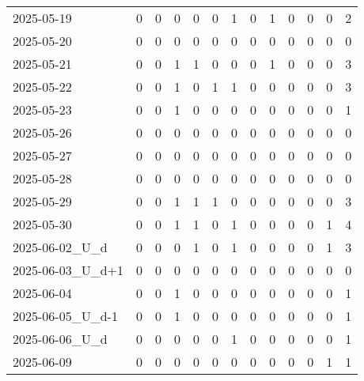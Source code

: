 \documentclass[dvipdfmx,oneside]{article}
\begin{document}
\begin{longtable}{lcccccccccccc}
        2025-05-19 &     0 &     0 &     0 &     0 &     0 &     1 &     0 &     1 &     0 &     0 &     0 &      2 \\
        2025-05-20 &     0 &     0 &     0 &     0 &     0 &     0 &     0 &     0 &     0 &     0 &     0 &      0 \\
        2025-05-21 &     0 &     0 &     1 &     1 &     0 &     0 &     0 &     1 &     0 &     0 &     0 &      3 \\
        2025-05-22 &     0 &     0 &     1 &     0 &     1 &     1 &     0 &     0 &     0 &     0 &     0 &      3 \\
        2025-05-23 &     0 &     0 &     1 &     0 &     0 &     0 &     0 &     0 &     0 &     0 &     0 &      1 \\
        2025-05-26 &     0 &     0 &     0 &     0 &     0 &     0 &     0 &     0 &     0 &     0 &     0 &      0 \\
        2025-05-27 &     0 &     0 &     0 &     0 &     0 &     0 &     0 &     0 &     0 &     0 &     0 &      0 \\
        2025-05-28 &     0 &     0 &     0 &     0 &     0 &     0 &     0 &     0 &     0 &     0 &     0 &      0 \\
        2025-05-29 &     0 &     0 &     1 &     1 &     1 &     0 &     0 &     0 &     0 &     0 &     0 &      3 \\
        2025-05-30 &     0 &     0 &     1 &     1 &     0 &     1 &     0 &     0 &     0 &     0 &     1 &      4 \\
  2025-06-02\_U\_d &     0 &     0 &     0 &     1 &     0 &     1 &     0 &     0 &     0 &     0 &     1 &      3 \\
2025-06-03\_U\_d+1 &     0 &     0 &     0 &     0 &     0 &     0 &     0 &     0 &     0 &     0 &     0 &      0 \\
        2025-06-04 &     0 &     0 &     1 &     0 &     0 &     0 &     0 &     0 &     0 &     0 &     0 &      1 \\
2025-06-05\_U\_d-1 &     0 &     0 &     1 &     0 &     0 &     0 &     0 &     0 &     0 &     0 &     0 &      1 \\
  2025-06-06\_U\_d &     0 &     0 &     0 &     0 &     0 &     1 &     0 &     0 &     0 &     0 &     0 &      1 \\
        2025-06-09 &     0 &     0 &     0 &     0 &     0 &     0 &     0 &     0 &     0 &     0 &     1 &      1 \\
\end{longtable}
\endgroup
\end{document}
